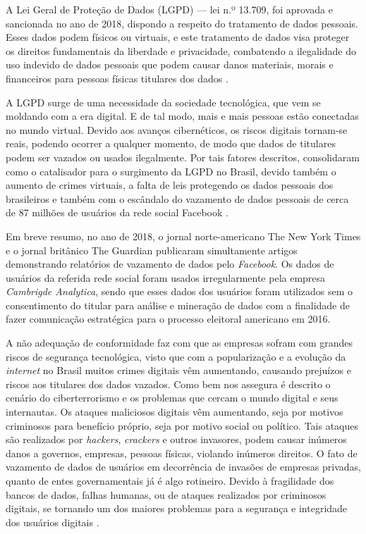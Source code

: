 \documentclass[
	12pt,				%
	openright,			%
	oneside,			%
	a4paper,			%
	english,			%
	french,				%
	spanish,			%
	brazil,				%
	]{abntex2}
\begin{document}
A Lei Geral de Proteção de Dados (LGPD) — lei n.º 13.709, foi aprovada e sancionada no ano de 2018, dispondo a respeito do tratamento de dados pessoais. Esses dados podem físicos ou virtuais, e este tratamento de dados visa proteger os direitos fundamentais da liberdade e privacidade, combatendo a ilegalidade do uso indevido de dados pessoais que podem causar danos materiais, morais e financeiros para pessoas físicas titulares dos dados \cite{01-01-LeiGeral}.

A LGPD surge de uma necessidade da sociedade tecnológica, que vem se moldando com a era digital. E de tal modo, mais e mais pessoas estão conectadas no mundo virtual. Devido aos avanços cibernéticos, os riscos digitais tornam-se reais, podendo ocorrer a qualquer momento,  de modo que dados de titulares podem ser vazados ou usados ilegalmente. Por tais fatores descritos, consolidaram como o catalisador para o surgimento da LGPD no Brasil, devido também o aumento de crimes virtuais, a falta de leis protegendo os dados pessoais dos brasileiros e também com o escândalo do vazamento de dados pessoais de cerca de 87 milhões de usuários da rede social Facebook \cite{01-02-OlharDigital}.

Em breve resumo, no ano de 2018, o jornal norte-americano The New York Times \cite{01-03-Rosenberg2018} e o jornal britânico The Guardian \cite{01-04-Graham} publicaram simultamente artigos demonstrando relatórios de vazamento de dados pelo \textit{Facebook}. Os  dados de usuários da referida rede social foram usados irregularmente pela empresa \textit{Cambrigde Analytica}, sendo que esses dados dos usuários foram utilizados sem o consentimento do titular para análise e mineração de dados com a finalidade de fazer comunicação estratégica para o processo eleitoral americano em 2016.

A não adequação de conformidade faz com que as empresas sofram com grandes riscos de segurança tecnológica, visto que com a popularização e a evolução da \textit{internet} no Brasil muitos crimes digitais vêm aumentando, causando prejuízos e riscos aos titulares dos dados vazados. Como bem nos assegura  é descrito o cenário do ciberterrorismo e os problemas que cercam o mundo digital e seus internautas. Os ataques maliciosos digitais vêm aumentando, seja por motivos criminosos para benefício próprio, seja por motivo social ou político. Tais ataques são realizados por \textit{hackers}, \textit{crackers} e outros invasores, podem causar inúmeros danos a governos, empresas, pessoas físicas, violando inúmeros direitos. O fato de vazamento de dados de usuários em decorrência de invasões de empresas privadas, quanto de entes governamentais já é algo rotineiro. Devido à fragilidade dos bancos de dados, falhas humanas, ou de ataques realizados por criminosos digitais, se tornando um dos maiores problemas para a segurança e integridade dos usuários digitais \cite{01-06-Dodsworth2021}.
\end{document}
